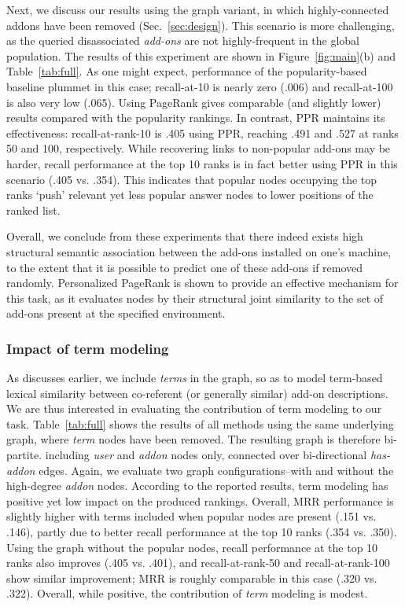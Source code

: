 \documentclass[11pt,oneside]{book}
\let\Oldsubsubsection\subsubsection
\renewcommand{\subsubsection}{\FloatBarrier\Oldsubsubsection}
\begin{document}
Next, we discuss our results using the graph variant, in which highly-connected addons have been removed (Sec.~\ref{sec:design}). This scenario is more challenging, as the queried disassociated {\it add-ons} are not highly-frequent in the global population. The results of this experiment are shown in Figure~\ref{fig:main}(b) and Table~\ref{tab:full}. As one might expect, performance of the popularity-based baseline plummet in this case; recall-at-10 is nearly zero (.006) and recall-at-100 is also very low (.065). Using PageRank gives comparable (and slightly lower) results compared with the popularity rankings. In contrast, PPR maintains its effectiveness: recall-at-rank-10 is .405 using PPR, reaching .491 and .527 at ranks 50 and 100, respectively. While recovering links to non-popular add-ons may be harder, recall performance at the top 10 ranks is in fact better using PPR in this scenario (.405 vs. .354). This indicates that popular nodes occupying the top ranks `push' relevant yet less popular answer nodes to lower positions of the ranked list.  

Overall, we conclude from these experiments that there indeed exists high structural semantic association between the add-ons installed on one's machine, to the extent that it is possible to predict one of these add-ons if removed randomly. Personalized PageRank is shown to provide an effective mechanism for this task, as it evaluates nodes by their structural joint similarity to the set of add-ons present at the specified environment. 

\subsubsection{Impact of term modeling}

As discusses earlier, we include {\it terms} in the graph, so as to model term-based lexical similarity between co-referent (or generally similar) add-on descriptions. We are thus interested in evaluating the contribution of term modeling to our task. Table~\ref{tab:full} shows the results of all methods using the same underlying graph, where {\it term} nodes have been removed. The resulting graph is therefore bi-partite. including {\it user} and {\it addon} nodes only, connected over bi-directional {\it has-addon} edges. Again, we evaluate two graph configurations--with and without the high-degree {\it addon} nodes. According to the reported results, term modeling has positive yet low impact on the produced rankings. Overall, MRR performance is slightly higher with terms included when popular nodes are present (.151 vs. .146), partly due to better recall  performance at the top 10 ranks (.354 vs. .350). Using the graph without the popular nodes, recall performance at the top 10 ranks also improves (.405 vs. .401), and recall-at-rank-50 and recall-at-rank-100 show similar improvement; MRR is roughly comparable in this case (.320 vs. .322). Overall, while positive, the contribution of {\it term} modeling is modest. 
\end{document}
